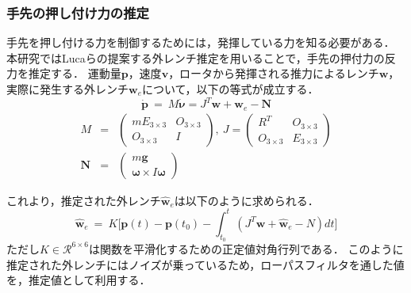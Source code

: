 \documentclass{jarticle}
\begin{document}
\subsubsection{手先の押し付け力の推定}
手先を押し付ける力を制御するためには，発揮している力を知る必要がある．
本研究ではLucaら\cite{wrench_est}の提案する外レンチ推定を用いることで，手先の押付力の反力を推定する．
運動量$\bm{p}$，速度$\bm{v}$，ロータから発揮される推力によるレンチ$\bm{w}$，実際に発生する外レンチ$\bm{w}_e$について，以下の等式が成立する．
\begin{equation}
    \dot{\bm{p}} ~=~ M\dot{\bm{\nu}} = J^T\bm{w} + \bm{w}_e - \bm{N}
\end{equation}
\begin{eqnarray*}
    M &=& \left( \begin{array}{rr} mE_{3\times3} & O_{3\times3} \\ O_{3\times3} & I \end{array} \right) ,~
    J = \left( \begin{array}{rr} R^T & O_{3\times3} \\ O_{3\times3} & E_{3\times3} \end{array} \right) \\
    \bm{N} &=& \left( \begin{array}{c} m\bm{g} \\ \bm{\omega}\times I\bm{\omega} \end{array} \right)
\end{eqnarray*}

これより，推定された外レンチ$\hat{\bm{w}}_e$は以下のように求められる．
\begin{equation}
    \hat{\bm{w}}_e ~=~ K \bigg[ \bm{p}(t) - \bm{p}(t_0) - \int_{t_0}^{t} (J^T\bm{w} + \hat{\bm{w}}_e - N)dt \bigg]
\end{equation}
ただし$K \in \mathcal{R}^{6\times6}$は関数を平滑化するための正定値対角行列である．
このように推定された外レンチにはノイズが乗っているため，ローパスフィルタを通した値を，推定値として利用する．
\end{document}
